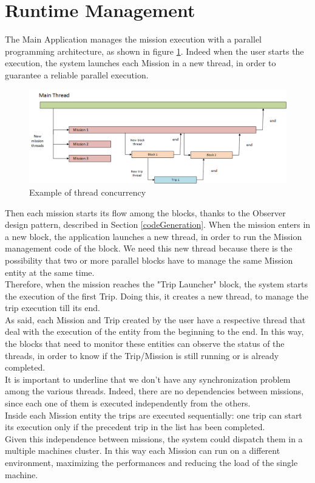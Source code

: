 \section{Runtime Management}\label{runtimeMng}

The Main Application manages the mission execution with a parallel programming architecture, as shown in figure \ref{fig:threads}.
Indeed when the user starts the execution, the system launches each Mission in a new thread, in order to guarantee a reliable parallel execution.
\\

\begin{figure}[h!]
\includegraphics[width=\linewidth]
{pictures/threads.png}
\caption{Example of thread concurrency}
\label{fig:threads}
\end{figure}

Then each mission starts its flow among the blocks, thanks to the Observer design pattern, described in Section \ref{codeGeneration}.
When the mission enters in a new block, the application launches a new thread, in order to run the Mission management code of the block.
We need this new thread because there is the possibility that two or more parallel blocks have to manage the same Mission entity at the same time.
\\

Therefore, when the mission reaches the "Trip Launcher" block, the system starts the execution of the first Trip.
Doing this, it creates a new thread, to manage the trip execution till its end.
\\

As said, each Mission and Trip created by the user have a respective thread that deal with the execution of the entity from the beginning to the end. 
In this way, the blocks that need to monitor these entities can observe the status of the threads, in order to know if the Trip/Mission is still running or is already completed.
\\

It is important to underline that we don't have any synchronization problem among the various threads.
Indeed, there are no dependencies between missions, since each one of them is executed independently from the others.
\\
Inside each Mission entity the trips are executed sequentially:
one trip can start its execution only if the precedent trip in the list has been completed.
\\
Given this independence between missions, the system could dispatch them in a multiple machines cluster.
In this way each Mission can run on a different environment, maximizing the performances and reducing the load of the single machine.
\\


